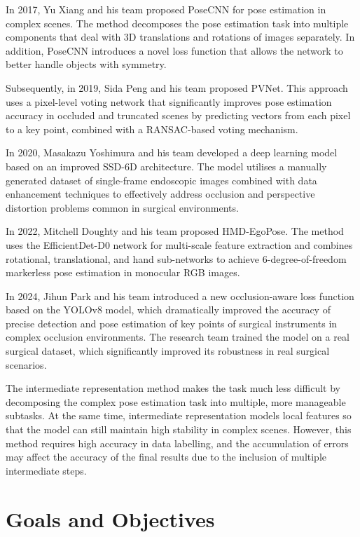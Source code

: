 \documentclass[12pt]{article}
\begin{document}
In 2017, Yu Xiang and his team proposed PoseCNN for pose estimation in complex scenes. The method decomposes the pose estimation task into multiple components that deal with 3D translations and rotations of images separately. In addition, PoseCNN introduces a novel loss function that allows the network to better handle objects with symmetry\cite{xiang2017posecnn}.

Subsequently, in 2019, Sida Peng and his team proposed PVNet\cite{peng2019pvnet}. This approach uses a pixel-level voting network that significantly improves pose estimation accuracy in occluded and truncated scenes by predicting vectors from each pixel to a key point, combined with a RANSAC-based voting mechanism.

In 2020, Masakazu Yoshimura and his team developed a deep learning model based on an improved SSD-6D architecture\cite{yoshimura2020single}. The model utilises a manually generated dataset of single-frame endoscopic images combined with data enhancement techniques to effectively address occlusion and perspective distortion problems common in surgical environments.

In 2022, Mitchell Doughty and his team proposed HMD-EgoPose\cite{yoshimura2020single}. The method uses the EfficientDet-D0 network for multi-scale feature extraction and combines rotational, translational, and hand sub-networks to achieve 6-degree-of-freedom markerless pose estimation in monocular RGB images.

In 2024, Jihun Park and his team introduced a new occlusion-aware loss function based on the YOLOv8 model, which dramatically improved the accuracy of precise detection and pose estimation of key points of surgical instruments in complex occlusion environments\cite{park2024towards}. The research team trained the model on a real surgical dataset, which significantly improved its robustness in real surgical scenarios.

The intermediate representation method makes the task much less difficult by decomposing the complex pose estimation task into multiple, more manageable subtasks. At the same time, intermediate representation models local features so that the model can still maintain high stability in complex scenes. However, this method requires high accuracy in data labelling, and the accumulation of errors may affect the accuracy of the final results due to the inclusion of multiple intermediate steps\cite{xu2023graph}\cite{allan20183}.


\section{Goals and Objectives}
\end{document}

